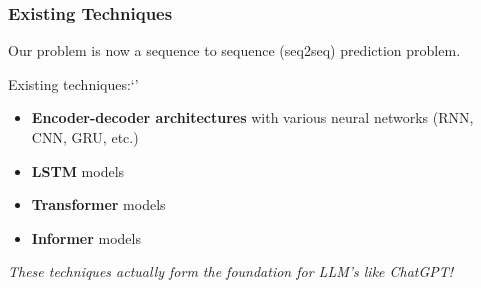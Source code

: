 \documentclass{beamer}
\begin{document}
\begin{frame}
    \frametitle{Existing Techniques}

    Our problem is now a \alert{sequence to sequence} (seq2seq) prediction problem.
    
    Existing techniques:`'
    \begin{itemize}
        \item {
            \textbf{Encoder-decoder architectures} with various neural networks 
            (RNN, CNN, GRU, etc.)
        }
        \item {
            \textbf{LSTM} models
        }
        \item {
            \textbf{Transformer} models
        }
        \item {
            \textbf{Informer} models
        }
    \end{itemize}

    \emph{These techniques actually form the foundation for LLM's like ChatGPT!}
\end{frame}
\end{document}
